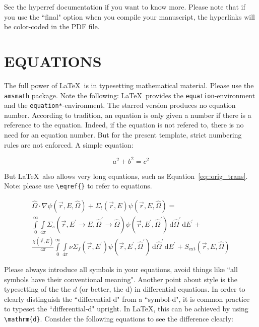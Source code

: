 \documentclass[12pt]{article}
\begin{document}
See the hyperref documentation if you want to know more. Please note that if you use the ``final" option when you compile your manuscript, the hyperlinks will be color-coded in the PDF file.

%
\section{EQUATIONS}
\label{sect::equations}

The full power of \LaTeX\ is in typesetting mathematical material. Please use the \texttt{amsmath} package. Note the following: \LaTeX\ provides the \texttt{equation}-environment and the \texttt{equation*}-environment. The starred version produces no equation number. According to tradition, an equation is only given a number if there is a reference to the equation. Indeed, if the equation is not refered to, there is no need for an equation number. But for the present template, strict numbering rules are not enforced. A simple equation:

\begin{equation*}
  a^2 + b^2 = c^2
\end{equation*}

But \LaTeX\ also allows very long equations, such as Equation~\eqref{eq::orig_trans}. Note: please use \verb|\eqref{}| to refer to equations.

\begin{multline}
  \hat \Omega \cdot \nabla \psi ( \vec r, E, \hat \Omega )  + \Sigma_t ( \vec r, E ) \psi ( \vec r, E, \hat \Omega ) = \\ \int \limits_{0}^{\infty} \! \int \limits_{4 \pi} \! \Sigma_s ( \vec r, E^\prime \rightarrow E, \hat \Omega^\prime \rightarrow \hat \Omega ) \psi ( \vec r, E^\prime, \hat \Omega^\prime ) \, \mathrm{d}\hat \Omega^\prime \, \mathrm{d}E^\prime + \\ \frac{\chi ( \vec r, E )}{4\pi} \int \limits_0^\infty \! \int \limits_{4\pi} \nu \Sigma_f ( \vec r, E^\prime ) \psi ( \vec r, E^\prime, \hat \Omega^\prime ) \, \mathrm{d} \hat \Omega^\prime \, \mathrm{d}E^\prime + S_\text{ext} ( \vec r, E, \hat \Omega ) \label{eq::orig_trans}
\end{multline}

Please always introduce all symbols in your equations, avoid things like ``all symbols have their conventional meaning". Another point about style is the typesetting of the the $d$ (or better, the $\mathrm{d}$) in differential equations. In order to clearly distinguish the ``differential-d" from a ``symbol-d", it is common practice to typeset the ``differential-d" upright. In \LaTeX, this can be achieved by using \verb|\mathrm{d}|. Consider the following equations to see the difference clearly:
\end{document}
